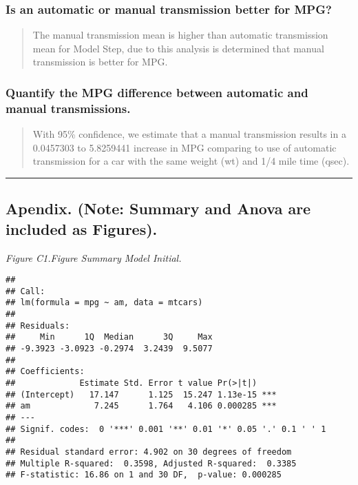 \documentclass[11pt,]{article}
\begin{document}
\subsubsection{Is an automatic or manual transmission better for
MPG?}\label{is-an-automatic-or-manual-transmission-better-for-mpg}

\begin{quote}
The manual transmission mean is higher than automatic transmission mean
for Model Step, due to this analysis is determined that manual
transmission is better for MPG.
\end{quote}

\subsubsection{Quantify the MPG difference between automatic and manual
transmissions.}\label{quantify-the-mpg-difference-between-automatic-and-manual-transmissions.}

\begin{quote}
With 95\% confidence, we estimate that a manual transmission results in
a 0.0457303 to 5.8259441 increase in MPG comparing to use of automatic
transmission for a car with the same weight (wt) and 1/4 mile time
(qsec).
\end{quote}

\begin{center}\rule{0.5\linewidth}{\linethickness}\end{center}

\subsection{Apendix. (Note: Summary and Anova are included as
Figures).}\label{apendix.-note-summary-and-anova-are-included-as-figures.}

\emph{Figure C1.Figure Summary Model Initial.}

\begin{verbatim}
## 
## Call:
## lm(formula = mpg ~ am, data = mtcars)
## 
## Residuals:
##     Min      1Q  Median      3Q     Max 
## -9.3923 -3.0923 -0.2974  3.2439  9.5077 
## 
## Coefficients:
##             Estimate Std. Error t value Pr(>|t|)    
## (Intercept)   17.147      1.125  15.247 1.13e-15 ***
## am             7.245      1.764   4.106 0.000285 ***
## ---
## Signif. codes:  0 '***' 0.001 '**' 0.01 '*' 0.05 '.' 0.1 ' ' 1
## 
## Residual standard error: 4.902 on 30 degrees of freedom
## Multiple R-squared:  0.3598, Adjusted R-squared:  0.3385 
## F-statistic: 16.86 on 1 and 30 DF,  p-value: 0.000285
\end{verbatim}
\end{document}
